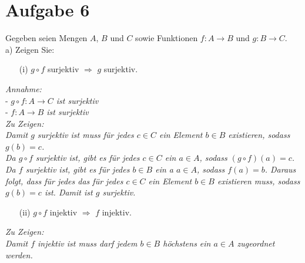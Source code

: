 \section*{Aufgabe 6}

Gegeben seien Mengen $A$, $B$ und $C$ sowie Funktionen $f: A \rightarrow B$ und $g: B \rightarrow C$.\\

a) Zeigen Sie:

\begin{enumerate}
\item[(i)] $g \circ f$ surjektiv $\Rightarrow$ $g$ surjektiv.
\end{enumerate}

\textit{Annahme:}\\
- \textit{$g \circ f: A \rightarrow C$ ist surjektiv}\\
- \textit{$f: A \rightarrow B$ ist surjektiv}\\

\textit{Zu Zeigen:}\\
\textit{Damit $g$ surjektiv ist muss für jedes $c \in C$ ein Element $b \in B$ existieren, sodass $g(b) = c$.}\\

\textit{Da $g \circ f$ surjektiv ist, gibt es für jedes $c \in C$ ein $a \in A$, sodass $(g \circ f)(a) = c$. Da $f$ surjektiv ist, gibt es für jedes $b \in B$ ein a $a \in A$, sodass $f(a) = b$. Daraus folgt, dass für jedes das für jedes $c \in C$ ein Element $b \in B$ existieren muss, sodass $g(b) = c$ ist. Damit ist $g$ surjektiv.}\\

\begin{enumerate}
\item[(ii)] $g \circ f$ injektiv $\Rightarrow$ $f$ injektiv.
\end{enumerate}

\textit{Zu Zeigen:}\\
\textit{Damit $f$ injektiv ist muss darf jedem $b \in B$ höchstens ein $a \in A$ zugeordnet werden.}\\
